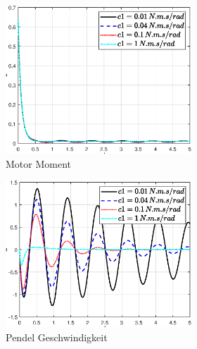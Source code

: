 \begin{figure}
\begin{figure}
\begin{subfigure}[b]{0.49\linewidth}
        \includegraphics[width=\linewidth]{Bilder/5_sensi/fig/c1/tau.eps}
        \caption{Motor Moment}
        \label{fig:c1_tau}
    \end{subfigure}
    \begin{subfigure}[b]{0.49\linewidth}
        \includegraphics[width=\linewidth]{Bilder/5_sensi/fig/c1/theta_punkt.eps}
        \caption{Pendel Geschwindigkeit}
        \label{fig:c1_theta_punkt}      
    \end{subfigure}
    \begin{subfigure}[b]{0.49\linewidth}

\end{subfigure}
\end{figure}
\end{figure}

